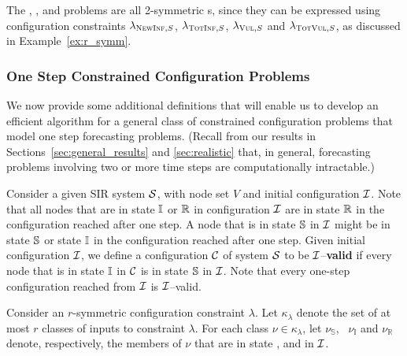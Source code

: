 The {\tNewInfs}, {\tTotInfs}, {\tVuls} and {\tTotVuls} problems are all 2-symmetric \tcpp{}s,
since they can be expressed using configuration constraints  
$\lambda_{\textsc{NewInf},S}$, $\lambda_{\textsc{TotInf},S}$, $\lambda_{\textsc{Vul},S}$
and $\lambda_{\textsc{TotVul},S}$, as discussed in Example~\ref{ex:r_symm}.



\subsubsection{One Step Constrained Configuration Problems}
\label{sss:one_step_poly}
  
We now provide some additional definitions that will enable
us to develop an efficient algorithm for a general class
of constrained configuration problems that model one step
forecasting problems.
(Recall from our results in 
Sections~\ref{sec:general_results} and \ref{sec:realistic}
that, in general, forecasting problems involving two or more time steps
are computationally intractable.)

Consider a given SIR system $\mbox{${\cal S}$}{}$, with node set $V$ and 
initial configuration $\mbox{${\cal I}$}{}$. 
Note that all nodes that are in state $\mbox{$\mathbb{I}$}$ or $\mbox{$\mathbb{R}$}$ in
configuration $\mbox{${\cal I}$}{}$ are in state $\mbox{$\mathbb{R}$}$ in the configuration
reached after one step.  A node that is in state $\mbox{$\mathbb{S}$}$  in
$\mbox{${\cal I}$}{}$ might be in state $\mbox{$\mathbb{S}$}$ or state $\mbox{$\mathbb{I}$}$ in the
configuration reached after one step.  
Given initial configuration $\mbox{${\cal I}$}{}$,
we define a configuration $\mbox{${\cal C}$}{}$ of system $\mbox{${\cal S}$}{}$
to be $\mbox{${\cal I}$}{}$--\textbf{valid}
if every node that is in state $\mbox{$\mathbb{I}$}$ in  $\mbox{${\cal C}$}{}$
is in state $\mbox{$\mathbb{S}$}$ in  $\mbox{${\cal I}$}{}$.
Note that every one-step configuration reached from $\mbox{${\cal I}$}{}$ is $\mbox{${\cal I}$}{}$--valid.

\newcommand{\nus}{\mbox{$\nu_{\mathbb{S}}$}}
\newcommand{\nui}{\mbox{$\nu_{\mathbb{I}}$}}
\newcommand{\nur}{\mbox{$\nu_{\mathbb{R}}$}}

Consider an $r$-symmetric configuration constraint $\lambda$.  
Let $\kappa_{\lambda}$ denote the set of at most $r$ classes of inputs
to constraint $\lambda$.  
For each class $\nu  \in \kappa_{\lambda}$,
let \nus{},~ \nui{} and \nur{} 
denote, respectively, the members of $\nu$ that are in state 
\sstate, \istate{} and \rstate{} in $\mbox{${\cal I}$}$. 

